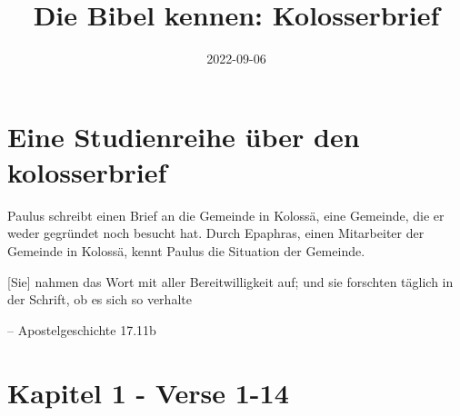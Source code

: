 \documentclass[
  12pt,
]{krantz}
\title{Die Bibel kennen: Kolosserbrief}
\author{}
\date{\vspace{-2.5em}2022-09-06}
\makeatletter
\newenvironment{kframe}{%
\medskip{}
\setlength{\fboxsep}{.8em}
 \def\at@end@of@kframe{}%
 \ifinner\ifhmode%
  \def\at@end@of@kframe{\end{minipage}}%
  \begin{minipage}{\columnwidth}%
 \fi\fi%
 \def\FrameCommand##1{\hskip\@totalleftmargin \hskip-\fboxsep
 \colorbox{shadecolor}{##1}\hskip-\fboxsep
     \hskip-\linewidth \hskip-\@totalleftmargin \hskip\columnwidth}%
 \MakeFramed {\advance\hsize-\width
   \@totalleftmargin\z@ \linewidth\hsize
   \@setminipage}}%
 {\par\unskip\endMakeFramed%
 \at@end@of@kframe}
\newenvironment{rmdblock}[1]
  {
  \begin{itemize}
  \renewcommand{\labelitemi}{
    \raisebox{-.7\height}[0pt][0pt]{
      {\setkeys{Gin}{width=3em,keepaspectratio}\texttt{[image: img/\#1]}}
    }
  }
  \setlength{\fboxsep}{1em}
  \begin{kframe}
  \item
  }
  {
  \end{kframe}
  \end{itemize}
  }
\newenvironment{rmdquote}
  {\begin{rmdblock}{quote}}
  {\end{rmdblock}}
\makeatother
\begin{document}
\maketitle

\thispagestyle{empty}
\mainmatter

{
\hypersetup{linkcolor=}
\setcounter{tocdepth}{2}
\tableofcontents
}
\hypertarget{eine-studienreihe-uxfcber-den-kolosserbrief}{%
\chapter{Eine Studienreihe über den kolosserbrief}\label{eine-studienreihe-uxfcber-den-kolosserbrief}}

Paulus schreibt einen Brief an die Gemeinde in Kolossä, eine Gemeinde, die
er weder gegründet noch besucht hat. Durch Epaphras, einen Mitarbeiter der
Gemeinde in Kolossä, kennt Paulus die Situation der Gemeinde.

\begin{rmdquote}
{[}Sie{]} nahmen das Wort mit aller Bereitwilligkeit auf; und sie
forschten täglich in der Schrift, ob es sich so verhalte

-- Apostelgeschichte 17.11b
\end{rmdquote}

\hypertarget{teil_01_1_14}{%
\chapter{Kapitel 1 - Verse 1-14}\label{teil_01_1_14}}
\end{document}
